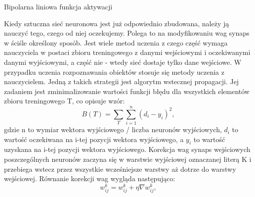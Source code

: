\documentclass[12pt,a4paper]{article}
\begin{document}
\begin{center}
\newline Bipolarna liniowa funkcja aktywacji
\end{center}

    
    Kiedy sztuczna sieć neuronowa jest już odpowiednio zbudowana, należy ją nauczyć tego, czego od niej oczekujemy. Polega to na modyfikowaniu wag synaps w ściśle określony sposób. Jest wiele metod uczenia z czego część wymaga nauczyciela w postaci zbioru treningowego z danymi wejściowymi i oczekiwanymi danymi wyjściowymi, a część nie - wtedy sieć dostaje tylko dane wejściowe. W przypadku uczenia rozpoznawania obiektów stosuje się metody uczenia z nauczycielem. Jedną z takich strategii jest algorytm wstecznej propagacji. Jej zadaniem jest zminimalizowanie wartości funkcji błędu dla wszystkich elementów zbioru treningowego T, co opisuje wzór:
    \begin{equation*}
        B(T) = \sum_{T}\sum_{i=1}^{n}(d_{i} - y_{i})^{2},
    \end{equation*}
    gdzie n to wymiar wektora wyjściowego / liczba neuronów wyjściowych, $d_{i}$ to wartość oczekiwana na i-tej pozycji wektora wyjściowego, a $y_{i}$ to wartość uzyskana na i-tej pozycji wektora wyjściowego. Korekcja wag synaps wejściowych poszczególnych neuronów zaczyna się w warstwie wyjściowej oznaczanej literą K i przebiega wstecz przez wszystkie wcześniejsze warstwy aż dotrze do warstwy wejściowej. Równanie korekcji wag wygląda następująco:
    \begin{equation*}
        w^k_{ij} = w^k_{ij} + \eta \nabla w^k_{ij},
    \end{equation*}
    
\end{document}
